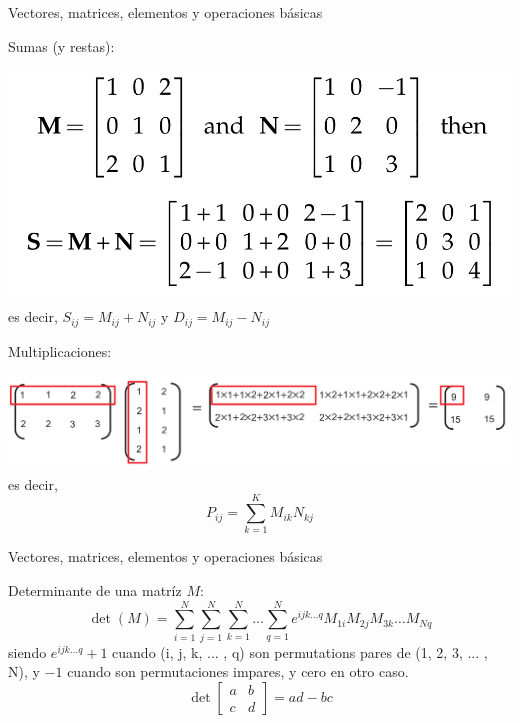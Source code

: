 \documentclass[aspectratio=169]{beamer}
\begin{document}
\begin{frame}
 {Vectores, matrices, elementos y operaciones b\'asicas}

{\color{black}
 \vskip 0cm
 Sumas (y restas): 
 \begin{center}  
 \vskip -1cm
 \includegraphics[width=0.5\linewidth]{images/sum_matrix.png} \\ \pause
 es decir, $S_{ij} = M_{ij} + N_{ij}$ \quad y \quad $D_{ij} = M_{ij} - N_{ij}$
 \end{center}
 \pause
\vskip -0.3cm Multiplicaciones: \pause
 \begin{center}
 \vskip -0.4cm \includegraphics[width=0.9\linewidth]{images/multiplication.png} \\ \pause
 \vskip -1.2cm es decir,
 \vskip -0.8cm \begin{equation*}
  P_{ij} = \sum^{K}_{k=1} M_{ik}N_{kj}
 \end{equation*}
 \end{center}
}

\end{frame}

\begin{frame}
 {Vectores, matrices, elementos y operaciones b\'asicas}
 
 {\color{black}
 Determinante de una matríz $M$: \pause
 \begin{equation*}
  \det{(M)} = \sum^N_{i=1}  \sum^N_{j=1}  \sum^N_{k=1} \dots \sum^N_{q=1} e^{ijk\dots q} M_{1i} M_{2j} M_{3k} \dots M_{Nq}
 \end{equation*} 
siendo $e^{ijk\dots q} +1$ cuando (i, j, k, ... , q) son permutations pares de (1, 2, 3, ... , N), y $-1$ cuando son permutaciones impares, y cero en otro caso.
 \pause
 \begin{equation*}
  \det{\begin{bmatrix}
        a & b \\
        c & d 
       \end{bmatrix}} = ad - bc
 \end{equation*}
}

\end{frame}
\end{document}
